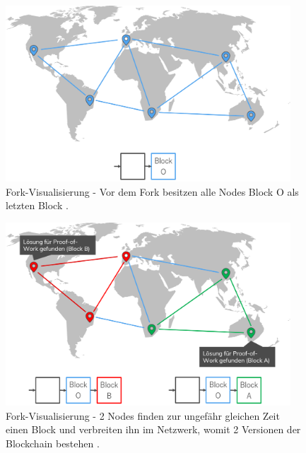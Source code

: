 \begin{figure}[!htbp]
  \centering
    \includegraphics[width=0.95\textwidth,angle=0]{images/fork_1}
 	\caption{Fork-Visualisierung - Vor dem Fork besitzen alle Nodes Block O als letzten Block \cite{AntonopoulosMasteringbitcoin2015}.}
	\label{fig:fork_1}
\end{figure}

\begin{figure}[!htbp]
  \centering
	\includegraphics[width=0.95\textwidth,angle=0]{images/fork_2}
 	\caption{Fork-Visualisierung - 2 Nodes finden zur ungefähr gleichen Zeit einen Block und verbreiten ihn im Netzwerk, womit 2 Versionen der Blockchain bestehen \cite{AntonopoulosMasteringbitcoin2015}.}
	\label{fig:fork_2}
\end{figure}

